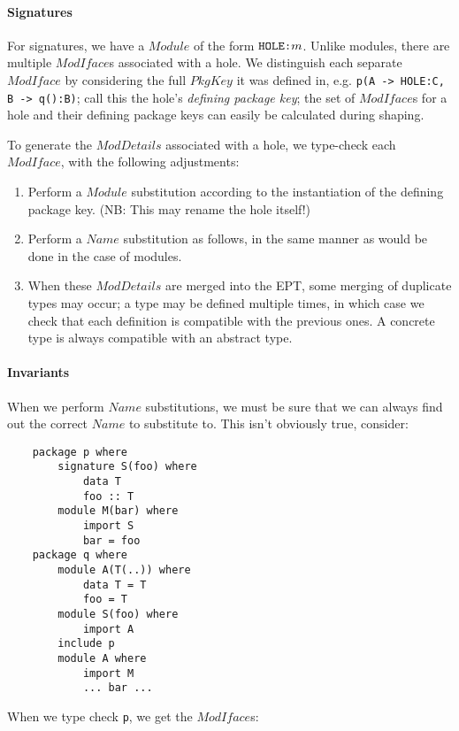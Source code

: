 \documentclass{article}
\newcommand{\I}[1]{\ensuremath{\mathit{#1}}}
\begin{document}
\paragraph{Signatures}  For signatures, we have a \I{Module} of the form
$\verb|HOLE:|m$.  Unlike modules, there are multiple \I{ModIface}s associated with a hole.
We distinguish each separate \I{ModIface} by considering the full \I{PkgKey}
it was defined in, e.g. \verb|p(A -> HOLE:C, B -> q():B)|; call this
the hole's \emph{defining package key}; the set of \I{ModIface}s for a hole
and their defining package keys can easily be calculated during shaping.

To generate the \I{ModDetails} associated with a hole, we type-check each
\I{ModIface}, with the following adjustments:

\begin{enumerate}
    \item Perform a \I{Module} substitution according to the instantiation
        of the defining package key.  (NB: This may rename the hole itself!)
    \item Perform a \I{Name} substitution as follows, in the same manner
        as would be done in the case of modules.
    \item When these \I{ModDetails} are merged into the EPT, some merging
        of duplicate types may occur; a type
        may be defined multiple times, in which case we check that each
        definition is compatible with the previous ones.  A concrete
        type is always compatible with an abstract type.
\end{enumerate}

\paragraph{Invariants} When we perform \I{Name} substitutions, we must be
sure that we can always find out the correct \I{Name} to substitute to.
This isn't obviously true, consider:

\begin{verbatim}
    package p where
        signature S(foo) where
            data T
            foo :: T
        module M(bar) where
            import S
            bar = foo
    package q where
        module A(T(..)) where
            data T = T
            foo = T
        module S(foo) where
            import A
        include p
        module A where
            import M
            ... bar ...
\end{verbatim}
%
When we type check \verb|p|, we get the \I{ModIface}s:
\end{document}
